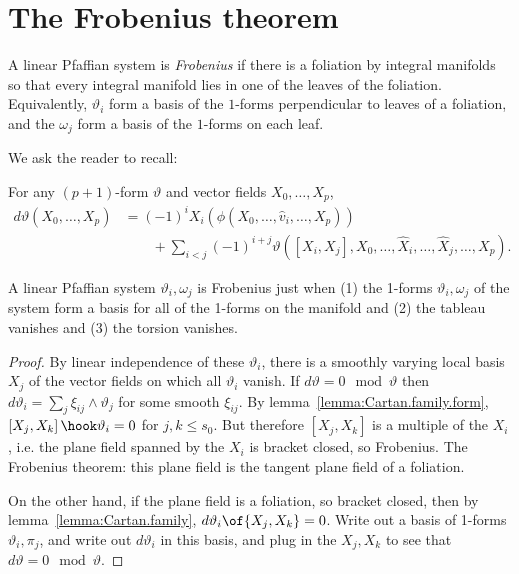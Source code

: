 \section{The Frobenius theorem}
A linear Pfaffian system is \emph{Frobenius} if there is a foliation by integral manifolds so that every integral manifold  lies in one of the leaves of the foliation.
Equivalently, \(\vartheta_i\) form a basis of the \(1\)-forms perpendicular to leaves of a foliation, and the \(\omega_j\) form a basis of the \(1\)-forms on each leaf.

We ask the reader to recall:
\begin{lemma}\label{lemma:Cartan.family.form}
For any \((p+1)\)-form \(\vartheta\) and vector fields \(X_0,\dots,X_p\),
\begin{align*}
d\vartheta(X_0,\dots,X_p)
&=
(-1)^i X_i (\phi(X_0,\dots,\hat{v}_i,\dots,X_p))
\\
& \qquad +
\sum_{i < j} (-1)^{i+j} \vartheta([X_i,X_j],X_0,\dots,\hat{X}_i,\dots,\hat{X}_j,\dots,X_p).
\end{align*}
\end{lemma}
\begin{theorem}\label{theorem:Frobenius.forms}
A linear Pfaffian system \(\vartheta_i,\omega_j\) is Frobenius just when (1) the 1-forms \(\vartheta_i, \omega_j\) of the system form a basis for all of the 1-forms on the manifold and (2) the tableau vanishes and (3) the torsion vanishes.
\end{theorem}
\begin{proof}
By linear independence of these \(\vartheta_i\), there is a smoothly varying local basis \(X_j\) of the vector fields on which all \(\vartheta_i\) vanish.
If \(d\vartheta=0 \mod{\vartheta}\) then \(d\vartheta_i = \sum_j \xi_{ij} \wedge \vartheta_j\) for some smooth \(\xi_{ij}\).
By lemma~\vref{lemma:Cartan.family.form}, \(\left[X_j,X_k\right] \hook \vartheta_i=0\) for \(j,k \le s_0\).
But therefore \(\left[X_j,X_k\right]\) is a multiple of the \(X_i\), i.e.  the plane field spanned by the \(X_i\) is bracket closed, so Frobenius.
The Frobenius theorem: this plane field is the tangent plane field of a foliation.

On the other hand, if the plane field is a foliation, so bracket closed, then by lemma~\vref{lemma:Cartan.family},  \(d\vartheta_i\of{X_j,X_k}=0\).
Write out a basis of 1-forms \(\vartheta_i, \pi_j\), and write out \(d\vartheta_i\) in this basis, and plug in the \(X_j, X_k\) to see that \(d\vartheta=0 \mod{\vartheta}\).
\end{proof}


